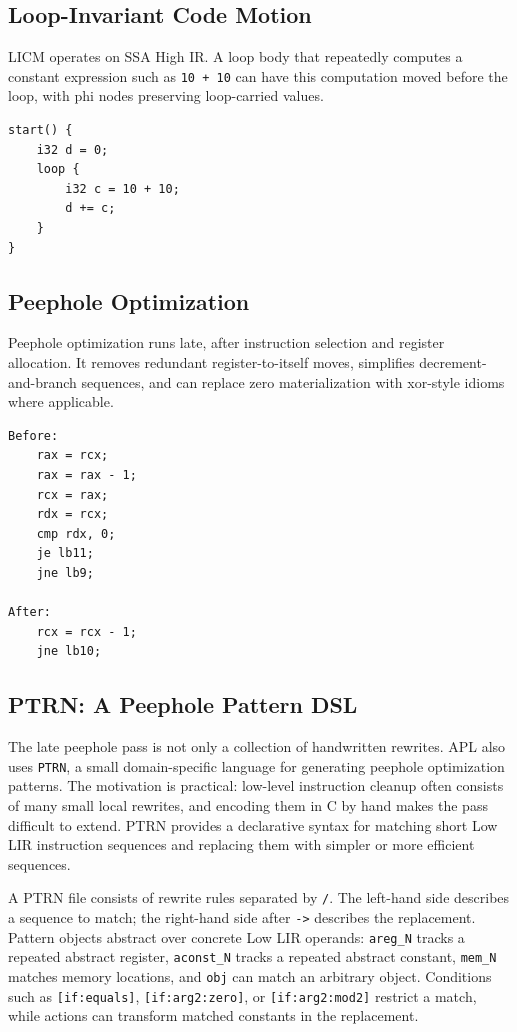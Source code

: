 \documentclass[10pt,twocolumn]{article}
\begin{document}
\subsection{Loop-Invariant Code Motion}

\par LICM operates on SSA High IR. A loop body that repeatedly computes a constant expression such as \texttt{10 + 10} can have this computation moved before the loop, with phi nodes preserving loop-carried values.

\begin{lstlisting}[language=APL,caption={LICM source pattern.}]
start() {
    i32 d = 0;
    loop {
        i32 c = 10 + 10;
        d += c;
    }
}
\end{lstlisting}

\subsection{Peephole Optimization}

\par Peephole optimization runs late, after instruction selection and register allocation. It removes redundant register-to-itself moves, simplifies decrement-and-branch sequences, and can replace zero materialization with xor-style idioms where applicable.

\begin{lstlisting}[caption={Peephole effect on a counted empty loop.}]
Before:
    rax = rcx;
    rax = rax - 1;
    rcx = rax;
    rdx = rcx;
    cmp rdx, 0;
    je lb11;
    jne lb9;

After:
    rcx = rcx - 1;
    jne lb10;
\end{lstlisting}


\subsection{PTRN: A Peephole Pattern DSL}

\par The late peephole pass is not only a collection of handwritten rewrites. APL also uses \texttt{PTRN}, a small domain-specific language for generating peephole optimization patterns. The motivation is practical: low-level instruction cleanup often consists of many small local rewrites, and encoding them in C by hand makes the pass difficult to extend. PTRN provides a declarative syntax for matching short Low LIR instruction sequences and replacing them with simpler or more efficient sequences.
\par A PTRN file consists of rewrite rules separated by \texttt{/}. The left-hand side describes a sequence to match; the right-hand side after \texttt{->} describes the replacement. Pattern objects abstract over concrete Low LIR operands: \texttt{areg\_N} tracks a repeated abstract register, \texttt{aconst\_N} tracks a repeated abstract constant, \texttt{mem\_N} matches memory locations, and \texttt{obj} can match an arbitrary object. Conditions such as \texttt{[if:equals]}, \texttt{[if:arg2:zero]}, or \texttt{[if:arg2:mod2]} restrict a match, while actions can transform matched constants in the replacement.
\end{document}
